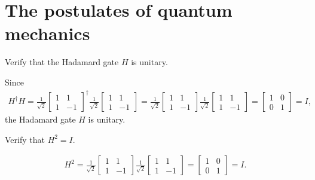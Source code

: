 \documentclass[en]{sol-man}
\begin{document}
\section{The postulates of quantum mechanics}

\begin{exe}
    Verify that the Hadamard gate $H$ is unitary.
\end{exe}
\begin{pf}
    Since
    \begin{align}
        H^{\dagger}H=\frac{1}{\sqrt{2}}\left[\begin{matrix}
            1&1\\
            1&-1
        \end{matrix}\right]^{\dagger}\frac{1}{\sqrt{2}}\left[\begin{matrix}
            1&1\\
            1&-1
        \end{matrix}\right]=\frac{1}{\sqrt{2}}\left[\begin{matrix}
            1&1\\
            1&-1
        \end{matrix}\right]\frac{1}{\sqrt{2}}\left[\begin{matrix}
            1&1\\
            1&-1
        \end{matrix}\right]=\left[\begin{matrix}
            1&0\\
            0&1
        \end{matrix}\right]=I,
    \end{align}
    the Hadamard gate $H$ is unitary.
\end{pf}

\begin{exe}
    Verify that $H^2=I$.
\end{exe}
\begin{pf}
    \begin{align}
        H^2=\frac{1}{\sqrt{2}}\left[\begin{matrix}
            1&1\\
            1&-1
        \end{matrix}\right]\frac{1}{\sqrt{2}}\left[\begin{matrix}
            1&1\\
            1&-1
        \end{matrix}\right]=\left[\begin{matrix}
            1&0\\
            0&1
        \end{matrix}\right]=I.
    \end{align}
\end{pf}
\end{document}
